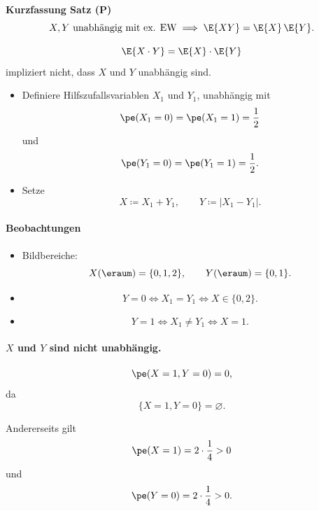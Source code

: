 \begin{satz}
    \textbf{Kurzfassung Satz (P)} 
    \[
        X,Y \text{ unabhängig mit ex. EW}
        \;\Longrightarrow\;
        \E{XY}
        =
        \E{X}\,\E{Y}.
    \]
\end{satz}

\begin{bsp} 
\[
        \E{X\cdot Y}
        =
        \E{X}\cdot\E{Y}
    \]
    impliziert nicht, dass \(X\) und \(Y\) unabhängig sind.

    \begin{itemize}
        \item Definiere Hilfszufallsvariablen \(X_1\) und \(Y_1\), unabhängig mit
        \[
            \pe(X_1=0)=\pe(X_1=1)=\frac12
        \]
        und
        \[
            \pe(Y_1=0)=\pe(Y_1=1)=\frac12.
        \]

        \item Setze
        \[
            X\coloneqq X_1+Y_1,
            \qquad
            Y\coloneqq|X_1-Y_1|.
        \]
    \end{itemize}

    \paragraph{Beobachtungen}

    \begin{itemize}
        \item Bildbereiche:
        \[
            X(\eraum)=\{0,1,2\},
            \qquad
            Y(\eraum)=\{0,1\}.
        \]

        \item
        \[
            Y=0
            \iff
            X_1=Y_1
            \iff
            X\in\{0,2\}.
        \]

        \item
        \[
            Y=1
            \iff
            X_1\neq Y_1
            \iff
            X=1.
        \]
    \end{itemize}

    \paragraph{\(X\) und \(Y\) sind nicht unabhängig.}

    \[
        \pe(X=1,Y=0)=0,
    \]
    da
    \[
        \{X=1,Y=0\}=\varnothing.
    \]

    Andererseits gilt
    \[
        \pe(X=1)
        =
        2\cdot\frac14
        >
        0
    \]
    und
    \[
        \pe(Y=0)
        =
        2\cdot\frac14
        >
        0.
    \]


\end{bsp}
